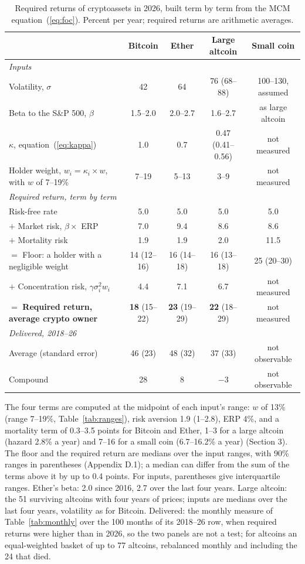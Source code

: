 \documentclass[11pt]{article}
\begin{document}
\begin{table}[ht]\centering\footnotesize
\caption{Required returns of cryptoassets in 2026, built term by term from the MCM equation~(\ref{eq:foc}). Percent per year; required returns are arithmetic averages.}
\label{tab:cross}
\setlength{\tabcolsep}{5pt}
\begin{tabular}{lcccc}
\toprule
 & Bitcoin & Ether & Large altcoin & Small coin \\
\midrule
\emph{Inputs} & & & & \\
Volatility, $\sigma$ & 42 & 64 & 76 (68--88) & 100--130, assumed \\
Beta to the S\&P 500, $\beta$ & 1.5--2.0 & 2.0--2.7 & 1.6--2.7 & as large altcoin \\
$\kappa$, equation~(\ref{eq:kappa}) & 1.0 & 0.7 & 0.47 (0.41--0.56) & not measured \\
Holder weight, $w_i = \kappa_i \times w$, with $w$ of 7--19\% & 7--19 & 5--13 & 3--9 & not measured \\
\midrule
\emph{Required return, term by term} & & & & \\
\phantom{$+$} Risk-free rate & 5.0 & 5.0 & 5.0 & 5.0 \\
$+$ Market risk, $\beta \times$ ERP & 7.0 & 9.4 & 8.6 & 8.6 \\
$+$ Mortality risk & 1.9 & 1.9 & 2.0 & 11.5 \\
$=$ Floor: a holder with a negligible weight & 14 (12--16) & 16 (14--18) & 16 (13--18) & 25 (20--30) \\
$+$ Concentration risk, $\gamma\sigma_i^2 w_i$ & 4.4 & 7.1 & 6.7 & not measured \\
$=$ \textbf{Required return, average crypto owner} & \textbf{18} (15--22) & \textbf{23} (19--29) & \textbf{22} (18--29) & not measured \\
\midrule
\emph{Delivered, 2018--26} & & & & \\
Average (standard error) & 46 (23) & 48 (32) & 37 (33) & not observable \\
Compound & 28 & 8 & $-3$ & not observable \\
\bottomrule
\end{tabular}
\par\smallskip\parbox{0.93\textwidth}{\footnotesize The four terms are computed at the midpoint of each input's range: $w$ of 13\% (range 7--19\%, Table~\ref{tab:ranges}), risk aversion 1.9 (1--2.8), ERP 4\%, and a mortality term of 0.3--3.5 points for Bitcoin and Ether, 1--3 for a large altcoin (hazard 2.8\% a year) and 7--16 for a small coin (6.7--16.2\% a year) (Section 3). The floor and the required return are medians over the input ranges, with 90\% ranges in parentheses (Appendix D.1); a median can differ from the sum of the terms above it by up to 0.4 points. For inputs, parentheses give interquartile ranges. Ether's beta: 2.0 since 2016, 2.7 over the last four years. Large altcoin: the 51 surviving altcoins with four years of prices; inputs are medians over the last four years, volatility as for Bitcoin. Delivered: the monthly measure of Table~\ref{tab:monthly} over the 100 months of its 2018--26 row, when required returns were higher than in 2026, so the two panels are not a test; for altcoins an equal-weighted basket of up to 77 altcoins, rebalanced monthly and including the 24 that died.}

\end{table}
\end{document}
